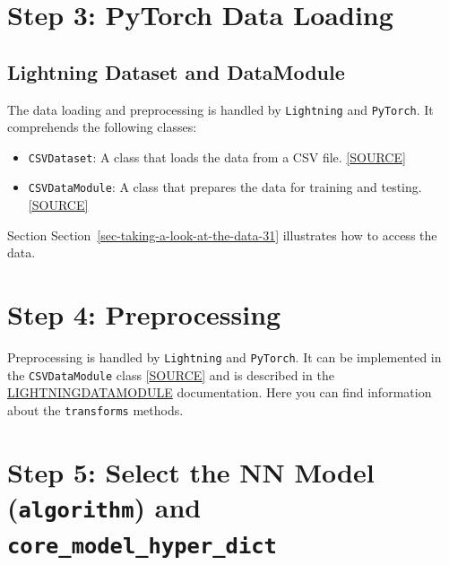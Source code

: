 \documentclass[
  letterpaper,
  DIV=11,
  numbers=noendperiod]{scrreprt}
\providecommand{\tightlist}{%
  \setlength{\itemsep}{0pt}\setlength{\parskip}{0pt}}\usepackage{longtable,booktabs,array}
\begin{document}
\hypertarget{sec-data-loading-31}{%
\section{Step 3: PyTorch Data Loading}\label{sec-data-loading-31}}

\hypertarget{lightning-dataset-and-datamodule}{%
\subsection{Lightning Dataset and
DataModule}\label{lightning-dataset-and-datamodule}}

The data loading and preprocessing is handled by \texttt{Lightning} and
\texttt{PyTorch}. It comprehends the following classes:

\begin{itemize}
\tightlist
\item
  \texttt{CSVDataset}: A class that loads the data from a CSV file.
  \href{https://github.com/sequential-parameter-optimization/spotPython/blob/main/src/spotPython/light/csvdataset.py}{{[}SOURCE{]}}
\item
  \texttt{CSVDataModule}: A class that prepares the data for training
  and testing.
  \href{https://github.com/sequential-parameter-optimization/spotPython/blob/main/src/spotPython/light/csvdatamodule.py}{{[}SOURCE{]}}
\end{itemize}

Section Section~\ref{sec-taking-a-look-at-the-data-31} illustrates how
to access the data.

\hypertarget{sec-preprocessing-31}{%
\section{Step 4: Preprocessing}\label{sec-preprocessing-31}}

Preprocessing is handled by \texttt{Lightning} and \texttt{PyTorch}. It
can be implemented in the \texttt{CSVDataModule} class
\href{https://github.com/sequential-parameter-optimization/spotPython/blob/main/src/spotPython/light/csvdatamodule.py}{{[}SOURCE{]}}
and is described in the
\href{https://lightning.ai/docs/pytorch/stable/data/datamodule.html}{LIGHTNINGDATAMODULE}
documentation. Here you can find information about the
\texttt{transforms} methods.

\hypertarget{sec-selection-of-the-algorithm-31}{%
\section{\texorpdfstring{Step 5: Select the NN Model
(\texttt{algorithm}) and
\texttt{core\_model\_hyper\_dict}}{Step 5: Select the NN Model (algorithm) and core\_model\_hyper\_dict}}\label{sec-selection-of-the-algorithm-31}}
\end{document}
